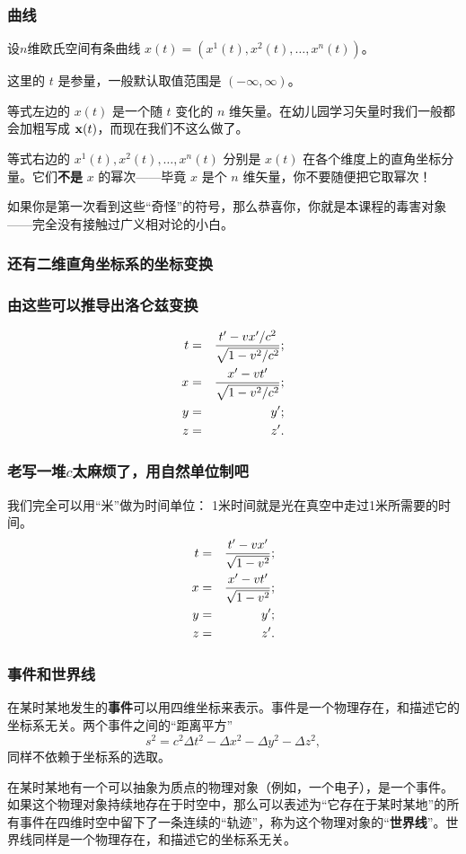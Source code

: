 \documentclass[CJK,13pt]{beamer}
\date{}
\begin{document}
  \bch
{}


\begin{frame}
  \frametitle{曲线}
  设$n$维欧氏空间有条曲线 $x(t) = (x^1(t), x^2(t), \ldots, x^n(t))$。

  \skipline
  \bitem
\item{这里的 $t$ 是参量，一般默认取值范围是 $(-\infty, \infty)$。}
\item{等式左边的 $x(t)$ 是一个随 $t$ 变化的 $n$ 维矢量。在幼儿园学习矢量时我们一般都会加粗写成 ${\mathbf{x}}(t)$，而现在我们不这么做了。}  
  \item{等式右边的 $x^1(t), x^2(t), \ldots, x^n(t)$ 分别是 $x(t)$ 在各个维度上的直角坐标分量。它们{\bf 不是} $x$ 的幂次——毕竟 $x$ 是个 $n$ 维矢量，你不要随便把它取幂次！}

    \eitem

    如果你是第一次看到这些“奇怪”的符号，那么恭喜你，你就是本课程的毒害对象——完全没有接触过广义相对论的小白。    
\end{frame}


\begin{frame}
  \frametitle{还有二维直角坐标系的坐标变换}
\end{frame}


\begin{frame}
  \frametitle{由这些可以推导出洛仑兹变换}
  \begin{eqnarray}
  t&=&\frac{t'-vx'/c^2}{\sqrt{1-v^2/c^2}}; \nonumber \\
  x&=&\frac{x'-vt'}{\sqrt{1-v^2/c^2}}; \nonumber \\
  y&=&y'; \nonumber \\
  z&=&z'. \nonumber
  \end{eqnarray}
\end{frame}


\begin{frame}
  \frametitle{老写一堆$c$太麻烦了，用自然单位制吧}
  我们完全可以用``米''做为时间单位： 1米时间就是光在真空中走过1米所需要的时间。
  \begin{eqnarray}
  t&=&\frac{t'-vx'}{\sqrt{1-v^2}}; \nonumber \\
  x&=&\frac{x'-vt'}{\sqrt{1-v^2}}; \nonumber \\
  y&=&y'; \nonumber \\
  z&=&z'. \nonumber
  \end{eqnarray}
\end{frame}

\begin{frame}
  \frametitle{事件和世界线}
  \bitem
  \item{在某时某地发生的{\bf 事件}可以用四维坐标来表示。事件是一个物理存在，和描述它的坐标系无关。两个事件之间的``距离平方'' $$s^2= c^2\Delta t^2 - \Delta x^2 -\Delta y^2-\Delta z^2,$$同样不依赖于坐标系的选取。}
  \item{在某时某地有一个可以抽象为质点的物理对象（例如，一个电子），是一个事件。如果这个物理对象持续地存在于时空中，那么可以表述为``它存在于某时某地''的所有事件在四维时空中留下了一条连续的“轨迹”，称为这个物理对象的“{\bf 世界线}”。世界线同样是一个物理存在，和描述它的坐标系无关。}
    \eitem
\end{frame}
\end{document}
